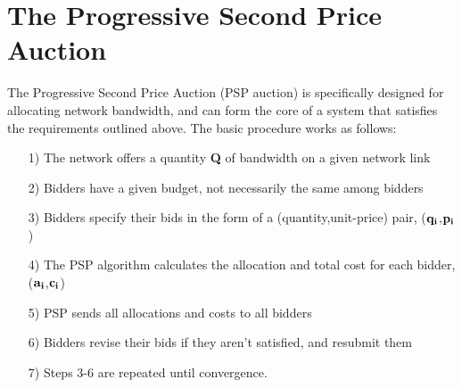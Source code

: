 \section{The Progressive Second Price Auction}

The Progressive Second Price Auction (PSP auction)\cite{PSP} is specifically designed for allocating network bandwidth, and can form the core of a system that satisfies the requirements outlined above. The basic procedure works as follows:

\begin{enumerate}
\item[1)] The network offers a quantity {\bf Q} of bandwidth on a given network link
\item[2)] Bidders have a given budget, not necessarily the same among bidders
\item[3)] Bidders specify their bids in the form of a (quantity,unit-price) pair, (${\bf q_i}$,${\bf p_i}$)
\item[4)] The PSP algorithm calculates the allocation and total cost for each bidder, (${\bf a_i}$,${\bf c_i}$)
\item[5)] PSP sends all allocations and costs to all bidders
\item[6)] Bidders revise their bids if they aren't satisfied, and resubmit them
\item[7)] Steps 3-6 are repeated until convergence.
\end{enumerate}
